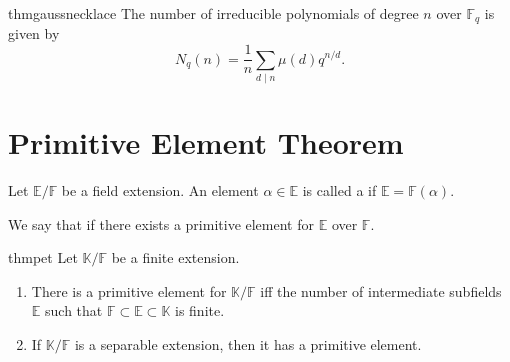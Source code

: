 \begin{restatable}[Gauss]{thm}{gaussnecklace}
\label{thm:gaussnecklace}
    The number of irreducible polynomials of degree $n$ over $\mathbb{F}_{q}$ is given by
    \begin{equation*} 
        N_q(n) = \frac{1}{n}\sum_{d \mid n} \mu(d)q^{n/d}.
    \end{equation*} \hfill\hyperref[thm:gaussnecklace2]{\downsym}
\end{restatable}

\section{Primitive Element Theorem}

\begin{defn}%
    Let $\mathbb{E}/\mathbb{F}$ be a field extension. An element $\alpha \in \mathbb{E}$ is called a  if $\mathbb{E} = \mathbb{F}(\alpha).$

    We say that  if there exists a primitive element for $\mathbb{E}$ over $\mathbb{F}.$
\end{defn}

\begin{restatable}{thm}{pet}
\label{thm:pet}
    Let $\mathbb{K}/\mathbb{F}$ be a finite extension. 
    \begin{enumerate}
        \item There is a primitive element for $\mathbb{K}/\mathbb{F}$ iff the number of intermediate subfields $\mathbb{E}$ such that $\mathbb{F} \subset \mathbb{E} \subset \mathbb{K}$ is finite.
        \item If $\mathbb{K}/\mathbb{F}$ is a separable extension, then it has a primitive element. \hfill\hyperref[thm:pet2]{\downsym}
    \end{enumerate}
\end{restatable}
